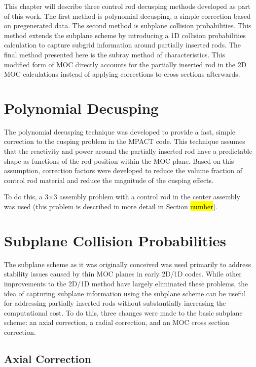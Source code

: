 This chapter will describe three control rod decusping methods developed as part of this work.  The first method is polynomial decusping, a simple correction based on pregenerated data.  The second method is subplane collision probabilities.  This method extends the subplane scheme by introducing a 1D collision probabilities calculation to capture subgrid information around partially inserted rods.  The final method presented here is the subray method of characteristics.  This modified form of MOC directly accounts for the partially inserted rod in the 2D MOC calculations instead of applying corrections to cross sections afterwards.

\section{Polynomial Decusping}

The polynomial decusping technique was developed to provide a fast, simple correction to the cusping problem in the MPACT code.  This technique assumes that the reactivity and power around the partially inserted rod have a predictable shape as functions of the rod position within the MOC plane.  Based on this assumption, correction factors were developed to reduce the volume fraction of control rod material and reduce the magnitude of the cusping effects.

To do this, a 3$\times$3 assembly problem with a control rod in the center assembly was used (this problem is described in more detail in Section \hl{number}).  

\section{Subplane Collision Probabilities}

The subplane scheme as it was originally conceived was used primarily to address stability issues caused by thin MOC planes in early 2D/1D codes.  While other improvements to the 2D/1D method have largely eliminated these problems, the idea of capturing subplane information using the subplane scheme can be useful for addressing partially inserted rods without substantially increasing the computational cost.  To do this, three changes were made to the basic subplane scheme: an axial correction, a radial correction, and an MOC cross section correction.

\subsection{Axial Correction}

